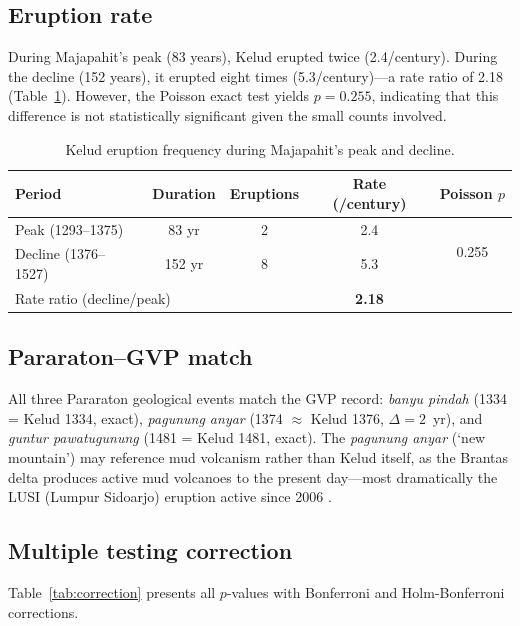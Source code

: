 \documentclass[12pt,a4paper]{article}
\begin{document}
\subsection{Eruption rate}

During Majapahit's peak (83 years), Kelud erupted twice (2.4/century).
During the decline (152 years), it erupted eight times (5.3/century)---a rate ratio of 2.18 (Table~\ref{tab:rates}).
However, the Poisson exact test yields $p = 0.255$, indicating that this difference is not statistically significant given the small counts involved.

\begin{table}[htbp]
\centering
\caption{Kelud eruption frequency during Majapahit's peak and decline.}
\label{tab:rates}
\begin{tabular}{lcccc}
\toprule
Period & Duration & Eruptions & Rate (/century) & Poisson $p$ \\
\midrule
Peak (1293--1375)    & 83 yr  & 2 & 2.4 & \multirow{2}{*}{0.255} \\
Decline (1376--1527) & 152 yr & 8 & 5.3 & \\
\midrule
\multicolumn{3}{l}{Rate ratio (decline/peak)} & \textbf{2.18} & \\
\bottomrule
\end{tabular}
\end{table}

\subsection{Pararaton--GVP match}

All three Pararaton geological events match the GVP record: \textit{banyu pindah} (1334 = Kelud 1334, exact), \textit{pagunung anyar} (1374 $\approx$ Kelud 1376, $\Delta = 2$~yr), and \textit{guntur pawatugunung} (1481 = Kelud 1481, exact).
The \textit{pagunung anyar} (`new mountain') may reference mud volcanism rather than Kelud itself, as the Brantas delta produces active mud volcanoes to the present day---most dramatically the LUSI (Lumpur Sidoarjo) eruption active since 2006 \citep{davies2011,satyana2015}.

\subsection{Multiple testing correction}

Table~\ref{tab:correction} presents all $p$-values with Bonferroni and Holm-Bonferroni corrections.
\end{document}
